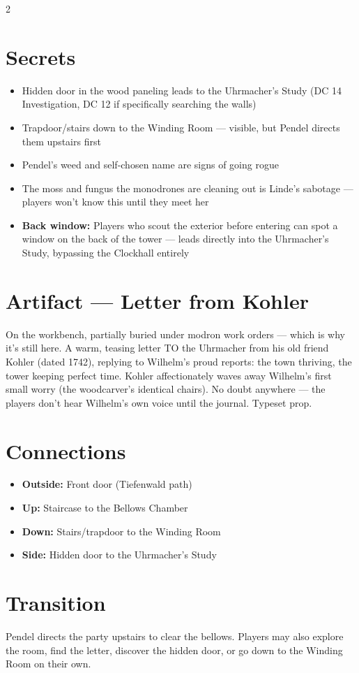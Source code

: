 \documentclass[10pt,letterpaper]{article}
\begin{document}
\begin{multicols}{2}
\section*{Secrets}
\begin{itemize}
\item Hidden door in the wood paneling leads to the Uhrmacher's Study (DC 14 Investigation, DC 12 if specifically searching the walls)
\item Trapdoor/stairs down to the Winding Room --- visible, but Pendel directs them upstairs first
\item Pendel's weed and self-chosen name are signs of going rogue
\item The moss and fungus the monodrones are cleaning out is Linde's sabotage --- players won't know this until they meet her
\item \textbf{Back window:} Players who scout the exterior before entering can spot a window on the back of the tower --- leads directly into the Uhrmacher's Study, bypassing the Clockhall entirely
\end{itemize}

\section*{Artifact --- Letter from Kohler}
On the workbench, partially buried under modron work orders --- which is why it's still here. A warm, teasing letter TO the Uhrmacher from his old friend Kohler (dated 1742), replying to Wilhelm's proud reports: the town thriving, the tower keeping perfect time. Kohler affectionately waves away Wilhelm's first small worry (the woodcarver's identical chairs). No doubt anywhere --- the players don't hear Wilhelm's own voice until the journal. Typeset prop.

\section*{Connections}
\begin{itemize}
\item \textbf{Outside:} Front door (Tiefenwald path)
\item \textbf{Up:} Staircase to the Bellows Chamber
\item \textbf{Down:} Stairs/trapdoor to the Winding Room
\item \textbf{Side:} Hidden door to the Uhrmacher's Study
\end{itemize}

\section*{Transition}
Pendel directs the party upstairs to clear the bellows. Players may also explore the room, find the letter, discover the hidden door, or go down to the Winding Room on their own.

\end{multicols}
\end{document}
